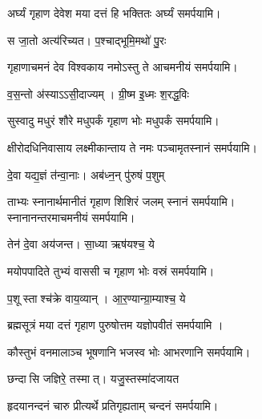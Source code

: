 \begin{center}
{अर्घ्यं गृहाण देवेश मया दत्तं हि भक्तितः}
\devAya{} अर्घ्यं समर्पयामि।

{स जा॒तो अत्य॑रिच्यत। प॒श्चाद्भूमि॒मथो॑ पु॒रः}

{गृहाणाचमनं देव विश्वकाय नमोऽस्तु ते}
\devAya{} आचमनीयं समर्पयामि।
\medskip


{व॒स॒न्तो अ॑स्याऽऽसी॒दाज्यम्। ग्री॒ष्म इ॒ध्मः श॒रद्ध॒विः}

{सुस्वादु मधुरं शौरे मधुपर्कं गृहाण भोः}
\devAya{} मधुपर्कं समर्पयामि।\medskip


{क्षीरोदधिनिवासाय लक्ष्मीकान्ताय ते नमः}
\devAya{} पञ्चामृतस्नानं समर्पयामि।
\medskip

{दे॒वा यद्य॒ज्ञं त॑न्वा॒नाः। अब॑ध्न॒न् पु॑रुषं प॒शुम्}

{ताभ्यः स्नानार्थमानीतं गृहाण शिशिरं जलम्‌}
\devAya{} स्नानं समर्पयामि। \\
स्नानानन्तरमाचमनीयं समर्पयामि। \\
\medskip

{तेन॑ दे॒वा अय॑जन्त। सा॒ध्या ऋष॑यश्च॒ ये}

{मयोपपादिते तुभ्यं वाससी च गृहाण भोः}
\devAya{} वस्रं समर्पयामि।\\
\medskip

{प॒शूस्ताश्च॑क्रे वाय॒व्यान्। आ॒र॒ण्यान्ग्रा॒म्याश्च॒ ये}

{ब्रह्मसूत्रं मया दत्तं गृहाण पुरुषोत्तम}
\devAya{} यज्ञोपवीतं समर्पयामि । 
\medskip

{कौस्तुभं वनमालाञ्च भूषणानि भजस्व भोः}
\devAya{} आभरणानि समर्पयामि। \\
\medskip

{छन्दासि जज्ञिरे॒ तस्मात्। यजु॒स्तस्मा॑दजायत}

{हृदयानन्दनं चारु प्रीत्यर्थे प्रतिगृह्यताम्}
\devAya{} चन्दनं समर्पयामि।\\
\medskip


\end{center}
